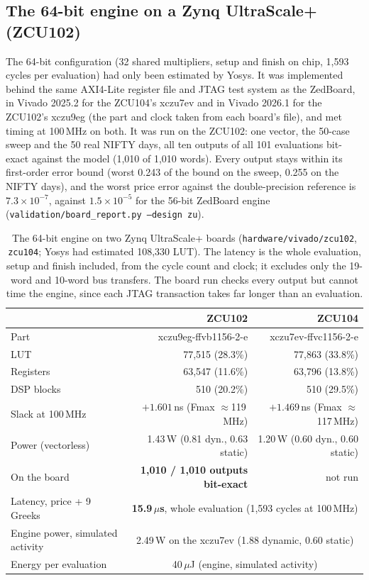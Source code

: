 \documentclass[11pt,a4paper]{article}
\newcommand{\hi}{\rowcolor{accentsoft}}
\begin{document}
\subsection{The 64-bit engine on a Zynq UltraScale+ (ZCU102)}
\label{sec:zcu104}
The 64-bit configuration (32 shared multipliers, setup and finish on chip, 1,593 cycles
per evaluation) had only been estimated by Yosys. It was implemented behind the same AXI4-Lite register file and JTAG test system as the
ZedBoard, in Vivado 2025.2 for the ZCU104's xczu7ev and in Vivado 2026.1 for the ZCU102's
xczu9eg (the part and clock taken from each board's file), and met timing at 100\,MHz on
both. It was run on the ZCU102: one vector, the 50-case sweep and the 50 real NIFTY days,
all ten outputs of all 101 evaluations bit-exact against the model (1,010 of 1,010 words).
Every output stays within its first-order error bound (worst 0.243 of the bound on the
sweep, 0.255 on the NIFTY days), and the worst price error against the double-precision
reference is $7.3\times10^{-7}$, against $1.5\times10^{-5}$ for the 56-bit ZedBoard engine
(\texttt{validation/board\_report.py --design zu}).

\begin{table}[H]
\centering
\small
\begin{tabular}{@{}lrr@{}}
\toprule
& \textbf{ZCU102} & \textbf{ZCU104}\\
\midrule
Part & xczu9eg-ffvb1156-2-e & xczu7ev-ffvc1156-2-e\\
LUT & 77,515 (28.3\%) & 77,863 (33.8\%)\\
Registers & 63,547 (11.6\%) & 63,796 (13.8\%)\\
DSP blocks & 510 (20.2\%) & 510 (29.5\%)\\
Slack at 100\,MHz & $+1.601$\,ns (Fmax $\approx$119\,MHz) & $+1.469$\,ns (Fmax $\approx$117\,MHz)\\
Power (vectorless) & 1.43\,W (0.81 dyn., 0.63 static) & 1.20\,W (0.60 dyn., 0.60 static)\\
\hi On the board & \textbf{1,010 / 1,010 outputs bit-exact} & not run\\
\midrule
\hi Latency, price + 9 Greeks & \multicolumn{2}{c}{\textbf{15.9\,$\mu$s}, whole evaluation (1,593 cycles at 100\,MHz)}\\
Engine power, simulated activity & \multicolumn{2}{c}{2.49\,W on the xczu7ev (1.88 dynamic, 0.60 static)}\\
Energy per evaluation & \multicolumn{2}{c}{40\,$\mu$J (engine, simulated activity)}\\
\bottomrule
\end{tabular}
\caption{The 64-bit engine on two Zynq UltraScale+ boards (\texttt{hardware/vivado/zcu102},
\texttt{zcu104}; Yosys had estimated 108,330 LUT). The latency is the whole evaluation,
setup and finish included, from the cycle count and clock; it excludes only the 19-word
and 10-word bus transfers. The board run checks every output but cannot time the engine,
since each JTAG transaction takes far longer than an evaluation.}
\label{tab:zcu104}
\end{table}
\end{document}
